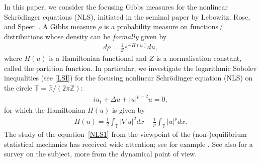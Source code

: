 \documentclass[letterpaper, 11pt,  reqno]{amsart}
\theoremstyle{definition}
\newcommand{\1}{\mathbbm 1}
\newcommand{\Z}{\mathbb{Z}}
\newcommand{\R}{\mathbb{R}}
\newcommand{\T}{\mathbb{T}}
\newcommand{\0}{\mathbf 0}
\numberwithin{equation}{section}
\numberwithin{theorem}{section}
\begin{document}
 
In this paper, we consider the focusing Gibbs measures
for the nonlinear Schr\"odinger equations (NLS), 
initiated in the seminal paper by Lebowitz, Rose, and Speer~\cite{Lebowitz1988}.
A Gibbs measure $\rho$
is a probability measure on 
functions\,/\,distributions 
whose density can be \emph{formally} given by
\begin{align}
d\rho = \frac 1 Z e^{- H(u)} d u , 
\label{Gibbs1}
\end{align}
\noindent
where  $H(u)$ is a Hamiltonian functional and $Z$ is a normalisation constant, called the partition function. 
In particular, we investigate the logarithmic
Sobolev inequalities (see \eqref{LSI}) for the focusing 
nonlinear Schr\"odinger equation (NLS) 
on the circle $\T = \R / (2\pi \Z)$:
\begin{align}
i u_t +  \Delta u + |u|^{p-2} u = 0, 
\label{NLS1}
\end{align}
for which the Hamiltonian $H(u)$ is given by 
\begin{align}
H(u) = \frac 12\int_\T |\nabla u|^2 d x - \frac 1 p\int_\T |u|^p d x.
\label{Gibbs2}
\end{align}
 The study of the equation~\eqref{NLS1}
 from the viewpoint of the (non-)equilibrium statistical mechanics 
 has received wide attention; see for example \cite{Lebowitz1988, Bo94, BO96, BO97,Tzv1,  Tzv2, LMW, BBulut, 
CFL, DNY2, Bring3}. See also \cite{BOP4} for a survey on the subject, more from the dynamical point of view.
 
\end{document}
